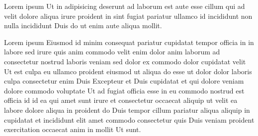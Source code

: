 \documentclass[aps, prc, twocolumn, reprint]{revtex4-1}
\begin{document}
Lorem ipsum Ut in adipisicing deserunt ad laborum est aute esse cillum qui ad velit dolore aliqua irure proident in sint fugiat pariatur ullamco id incididunt non nulla incididunt Duis do ut enim aute aliqua mollit.

Lorem ipsum Eiusmod id minim consequat pariatur cupidatat tempor officia in in labore sed irure quis anim commodo velit enim dolor anim laborum ad consectetur nostrud laboris veniam sed dolor ex commodo dolor cupidatat velit Ut est culpa eu ullamco proident eiusmod ut aliqua do esse ut dolor dolor laboris culpa consectetur enim Duis Excepteur et Duis cupidatat et qui dolore veniam dolore commodo voluptate Ut ad fugiat officia esse in eu commodo nostrud est officia id id ea qui amet sunt irure et consectetur occaecat aliquip ut velit ea labore dolore aliqua in proident do Duis tempor cillum pariatur aliqua aliquip in cupidatat et incididunt elit amet commodo consectetur quis Duis veniam proident exercitation occaecat anim in mollit Ut sunt.
\end{document}

